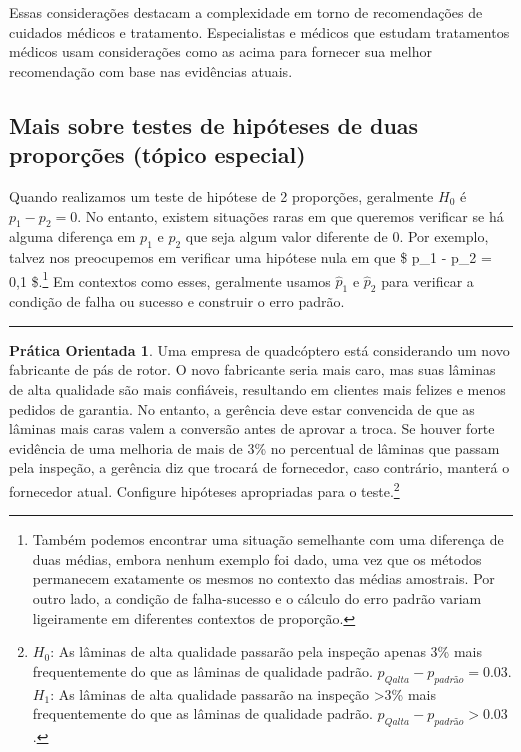 \documentclass[
]{book}
\theoremstyle{definition}
\theoremstyle{definition}
\theoremstyle{definition}
\newtheorem{exercise}{Prática Orientada}[chapter]
\theoremstyle{definition}
\theoremstyle{remark}
\begin{document}
Essas considerações destacam a complexidade em torno de recomendações de cuidados médicos e tratamento. Especialistas e médicos que estudam tratamentos médicos usam considerações como as acima para fornecer sua melhor recomendação com base nas evidências atuais.

\hypertarget{moreHTTwoProportions}{%
\subsection{Mais sobre testes de hipóteses de duas proporções (tópico especial)}\label{moreHTTwoProportions}}

Quando realizamos um teste de hipótese de 2 proporções, geralmente \(H_0\) é \(p_1 - p_2 = 0\). No entanto, existem situações raras em que queremos verificar se há alguma diferença em \(p_1\) e \(p_2\) que seja algum valor diferente de 0. Por exemplo, talvez nos preocupemos em verificar uma hipótese nula em que \$ p\_1 - p\_2 = 0,1 \$.\footnote{Também podemos encontrar uma situação semelhante com uma diferença de duas médias, embora nenhum exemplo foi dado, uma vez que os métodos permanecem exatamente os mesmos no contexto das médias amostrais. Por outro lado, a condição de falha-sucesso e o cálculo do erro padrão variam ligeiramente em diferentes contextos de proporção.} Em contextos como esses, geralmente usamos \(\hat{p}_1\) e \(\hat{p}_2\) para verificar a condição de falha ou sucesso e construir o erro padrão.

\begin{center}\rule{0.5\linewidth}{0.5pt}\end{center}

\begin{exercise}
\protect\hypertarget{exr:carWheelBladeManufacturer}{}{\label{exr:carWheelBladeManufacturer} }Uma empresa de quadcóptero está considerando um novo fabricante de pás de rotor. O novo fabricante seria mais caro, mas suas lâminas de alta qualidade são mais confiáveis, resultando em clientes mais felizes e menos pedidos de garantia. No entanto, a gerência deve estar convencida de que as lâminas mais caras valem a conversão antes de aprovar a troca. Se houver forte evidência de uma melhoria de mais de 3\% no percentual de lâminas que passam pela inspeção, a gerência diz que trocará de fornecedor, caso contrário, manterá o fornecedor atual. Configure hipóteses apropriadas para o teste.\footnote{\(H_0\): As lâminas de alta qualidade passarão pela inspeção apenas 3\% mais frequentemente do que as lâminas de qualidade padrão. \(p_{Qalta} - p_{padrão} = 0.03\). \(H_1\): As lâminas de alta qualidade passarão na inspeção \textgreater3\% mais frequentemente do que as lâminas de qualidade padrão. \(p_{Qalta} - p_{padrão} > 0.03\).}
\end{exercise}
\end{document}
